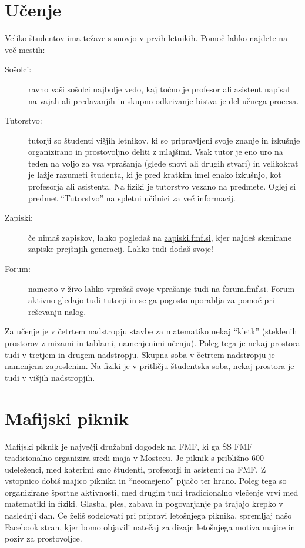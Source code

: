 \documentclass[a4paper,notumble]{leaflet} %
\begin{document}
  \section{Učenje}
  Veliko študentov ima težave s snovjo
  v prvih letnikih. Pomoč lahko najdete na več mestih:
  \begin{description}
    \item[Sošolci:] ravno vaši sošolci najbolje vedo,
    kaj točno je profesor ali asistent napisal na vajah
    ali predavanjih in skupno odkrivanje bistva je del učnega procesa.
    \item[Tutorstvo:] tutorji so študenti višjih letnikov, ki so pripravljeni svoje znanje in izkušnje organizirano in prostovoljno deliti z mlajšimi. Vsak tutor je eno uro na teden na voljo za vsa vprašanja (glede snovi ali drugih stvari) in velikokrat je lažje razumeti študenta, ki je pred kratkim imel enako izkušnjo, kot profesorja ali asistenta. Na fiziki je tutorstvo vezano na predmete.
    Oglej si predmet ``Tutorstvo'' na spletni učilnici za več informacij.
    \item[Zapiski:] če nimaš zapiskov, lahko pogledaš na \url{zapiski.fmf.si}, kjer najdeš skenirane zapiske prejšnjih generacij. Lahko tudi dodaš svoje!
    \item[Forum:] namesto v živo lahko vprašaš svoje vprašanje tudi na \url{forum.fmf.si}. Forum aktivno gledajo tudi tutorji in se ga pogosto uporablja za pomoč pri reševanju nalog.
  \end{description}
  Za učenje je v četrtem nadstropju stavbe za matematiko nekaj ``kletk'' (steklenih prostorov
  z mizami in tablami, namenjenimi učenju). Poleg tega je nekaj prostora tudi v tretjem in drugem nadstropju. Skupna soba v četrtem nadstropju je namenjena zaposlenim. Na fiziki je v pritličju študentska soba, nekaj prostora je tudi v višjih nadstropjih.
  
  \vspace*{-2ex}    
  \section{Mafijski piknik}
  Mafijski piknik je največji družabni dogodek na FMF, ki ga ŠS FMF tradicionalno organizira sredi maja v Mostecu. 
  Je piknik s približno 600 udeleženci, med katerimi smo študenti, profesorji in asistenti na FMF. Z vstopnico dobiš
  majico piknika in ``neomejeno'' pijačo ter hrano.
  Poleg tega so organizirane športne aktivnosti, med drugim tudi tradicionalno vlečenje 
  vrvi med matematiki in fiziki. Glasba, ples, zabava in pogovarjanje pa trajajo krepko v naslednji dan.
  Če želiš sodelovati pri pripravi letošnjega piknika, spremljaj našo Facebook stran, kjer bomo objavili natečaj za dizajn letošnjega motiva majice in poziv za prostovoljce.
  
\end{document}
